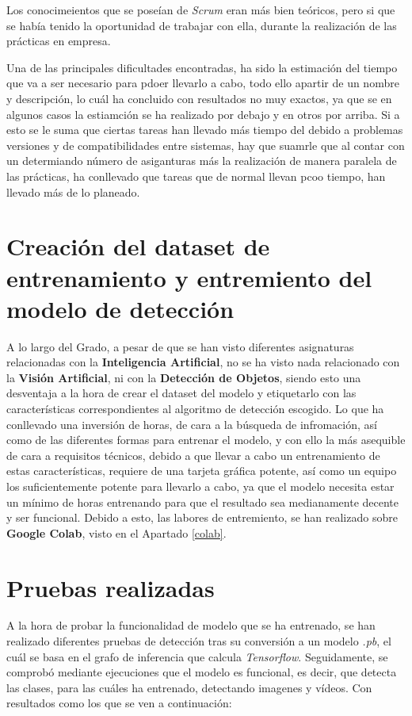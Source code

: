 Los conocimeientos que se poseían de \textit{Scrum} eran más bien teóricos, pero si que se había tenido la oportunidad de trabajar con ella, durante la realización de las prácticas en empresa.

Una de las principales dificultades encontradas, ha sido la estimación del tiempo que va a ser necesario para pdoer llevarlo a cabo, todo ello apartir de un nombre y descripción, lo cuál ha concluido con resultados no muy exactos, ya que se en algunos casos la estiamción se ha realizado por debajo y en otros por arriba. Si a esto se le suma que ciertas tareas han llevado más tiempo del debido a problemas versiones y de compatibilidades entre sistemas, hay que suamrle que al contar con un determiando número de asiganturas
más la realización de manera paralela de las prácticas, ha conllevado que tareas que de normal llevan pcoo tiempo, han llevado más de lo planeado.

\section{Creación del dataset de entrenamiento y entremiento del modelo de detección}
A lo largo del Grado, a pesar de que se han visto diferentes asignaturas relacionadas con la \textbf{Inteligencia Artificial}, no se ha visto nada relacionado con la \textbf{Visión Artificial}, ni con la \textbf{Detección de Objetos}, siendo esto una desventaja a la hora de crear el dataset del modelo y etiquetarlo con las características correspondientes al algoritmo de detección escogido. Lo que ha conllevado una inversión de horas, de cara a la búsqueda de infromación, así como de las diferentes formas para entrenar el modelo, y con ello la más asequible de cara a requisitos técnicos, debido a que llevar a cabo un entrenamiento de estas características, 
requiere de una tarjeta gráfica potente, así como un equipo los suficientemente potente para llevarlo a cabo, ya que el modelo necesita estar un mínimo de horas entrenando para que el resultado sea medianamente decente y ser funcional.
Debido a esto, las labores de entremiento, se han realizado sobre \textbf{Google Colab}, visto en el Apartado \ref{colab}.

\section{Pruebas realizadas}
A la hora de probar la funcionalidad de modelo que se ha entrenado, se han realizado diferentes pruebas de detección tras su conversión a un modelo \textit{.pb}, el cuál se basa en el grafo de inferencia que calcula \textit{Tensorflow}.
Seguidamente, se comprobó mediante ejecuciones que el modelo es funcional, es decir, que detecta las clases, para las cuáles ha entrenado, detectando imagenes y vídeos.
Con resultados como los que se ven a continuación:

